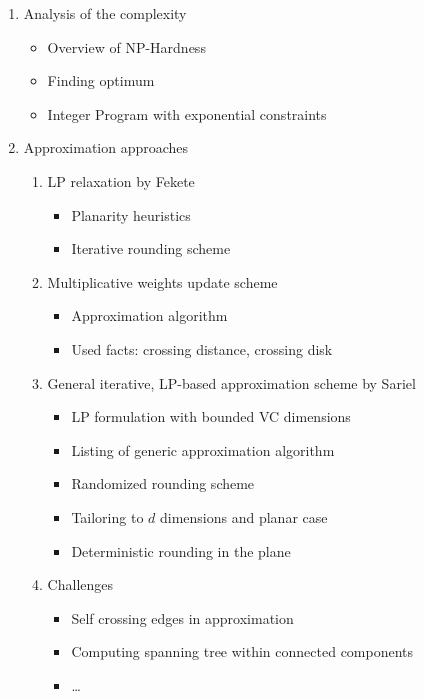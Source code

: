 \documentclass[a4paper,pagesize]{scrartcl}
\begin{document}
\begin{enumerate}
        \item Analysis of the complexity
            \begin{itemize}
                \item Overview of NP-Hardness
                \item Finding optimum
                \item Integer Program with exponential constraints
            \end{itemize}

        \item Approximation approaches
            \begin{enumerate}
                \item LP relaxation by Fekete
                    \begin{itemize}
                        \item Planarity heuristics
                        \item Iterative rounding scheme
                    \end{itemize}
                \item Multiplicative weights update scheme
                    \begin{itemize}
                        \item Approximation algorithm
                        \item Used facts: crossing distance, crossing disk
                    \end{itemize}
                \item General iterative, LP-based approximation scheme by Sariel
                    \begin{itemize}
                        \item LP formulation with bounded VC dimensions
                        \item Listing of generic approximation algorithm
                        \item Randomized rounding scheme
                        \item Tailoring to $d$ dimensions and planar case
                        \item Deterministic rounding in the plane
                    \end{itemize}
                \item Challenges
                    \begin{itemize}
                        \item Self crossing edges in approximation
                        \item Computing spanning tree within connected
                            components
                        \item \dots
                    \end{itemize}
            \end{enumerate}


\end{enumerate}
\end{document}
